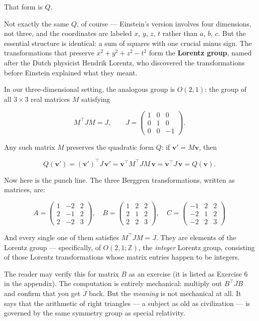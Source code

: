That form is \(Q\).

Not exactly the same \(Q\), of course --- Einstein's version involves four dimensions, not three, and the coordinates are labeled \(x\), \(y\), \(z\), \(t\) rather than \(a\), \(b\), \(c\). But the essential structure is identical: a sum of squares with one crucial minus sign. The transformations that preserve \(x^2 + y^2 + z^2 - t^2\) form the \textbf{Lorentz group}, named after the Dutch physicist Hendrik Lorentz, who discovered the transformations before Einstein explained what they meant.

In our three-dimensional setting, the analogous group is \(O(2,1)\): the group of all \(3 \times 3\) real matrices \(M\) satisfying

\[M^\top J M = J, \qquad J = \begin{pmatrix} 1 & 0 & 0 \\ 0 & 1 & 0 \\ 0 & 0 & -1 \end{pmatrix}.\]

Any such matrix \(M\) preserves the quadratic form \(Q\): if \(\mathbf{v}' = M\mathbf{v}\), then

\[Q(\mathbf{v}') = (\mathbf{v}')^\top J\, \mathbf{v}' = \mathbf{v}^\top M^\top J M\, \mathbf{v} = \mathbf{v}^\top J\, \mathbf{v} = Q(\mathbf{v}).\]

Now here is the punch line. The three Berggren transformations, written as matrices, are:

\[A = \begin{pmatrix} 1 & -2 & 2 \\ 2 & -1 & 2 \\ 2 & -2 & 3 \end{pmatrix}, \quad B = \begin{pmatrix} 1 & 2 & 2 \\ 2 & 1 & 2 \\ 2 & 2 & 3 \end{pmatrix}, \quad C = \begin{pmatrix} -1 & 2 & 2 \\ -2 & 1 & 2 \\ -2 & 2 & 3 \end{pmatrix}\]

And every single one of them satisfies \(M^\top J M = J\). They are elements of the Lorentz group --- specifically, of \(O(2,1; \mathbb{Z})\), the \emph{integer} Lorentz group, consisting of those Lorentz transformations whose matrix entries happen to be integers.

The reader may verify this for matrix \(B\) as an exercise (it is listed as Exercise 6 in the appendix). The computation is entirely mechanical: multiply out \(B^\top J B\) and confirm that you get \(J\) back. But the \emph{meaning} is not mechanical at all. It says that the arithmetic of right triangles --- a subject as old as civilization --- is governed by the same symmetry group as special relativity.


